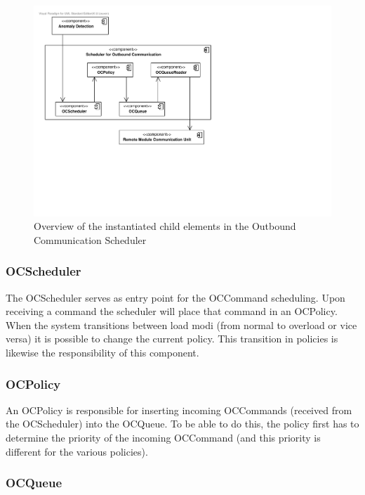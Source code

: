 \begin{figure}[H]
	\begin{centering}
		\includegraphics[width=\textwidth]{figs/add-it7-elements.pdf}
		\caption{Overview of the instantiated child elements in the Outbound
		Communication Scheduler}
		\label{fig:it7/elements}
	\end{centering}
\end{figure}

\subsubsection{OCScheduler}

\npar The OCScheduler serves as entry point for the OCCommand scheduling. Upon
receiving a command the scheduler will place that command in an
OCPolicy. When the system transitions between load modi (from normal
to overload or vice versa) it is possible to change the current policy.
This transition in policies is likewise the responsibility of this component.

\subsubsection{OCPolicy}

\npar An OCPolicy is responsible for inserting incoming OCCommands (received
from the OCScheduler) into the OCQueue. To be able to do this, the policy first
has to determine the priority of the incoming OCCommand (and this priority is
different for the various policies).

\subsubsection{OCQueue}

